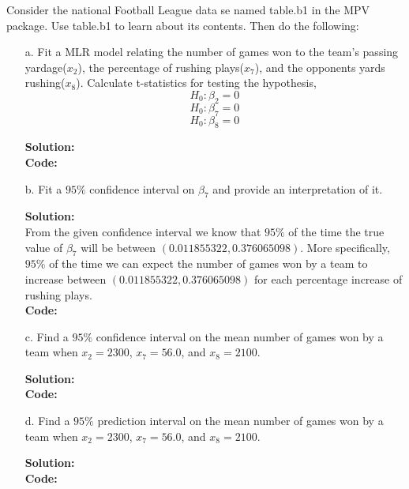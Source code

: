 \documentclass[12pt]{article}
\makeatletter
\theoremstyle{homework}
\newenvironment{exercise}[1]
{\def\@currentlabel{#1}\exercisecore}
{\endexercisecore}
\newcommand{\localhead}[1]{\par\smallskip\noindent\textbf{#1}\nobreak\\}%
\newcommand\solution{\localhead{Solution:}}
\makeatother
\begin{document}
\begin{exercise}{1}Consider the national Football League data se named table.b1 in the MPV package. 
  Use table.b1 to learn about its contents. Then do the following:

  \begin{enumerate}
    \item[a.] Fit a MLR model relating the number of games won to the team's passing yardage($x_2$),
    the percentage of rushing plays($x_7$), and the opponents yards rushing($x_8$). Calculate t-statistics for testing the hypothesis, 
    \begin{equation*}
      H_0: \beta_2 = 0
    \end{equation*} 
    \begin{equation*}
      H_0: \beta_7 = 0
    \end{equation*} 
    \begin{equation*}
      H_0: \beta_8 = 0
    \end{equation*} 
    \solution 
     \textbf{Code:}
     \begin{center}
     
     \end{center} 
     \newpage

     \item[b.] Fit a $95\%$ confidence interval on $\beta_7$ and provide an interpretation of it. \\
    \solution From the given confidence interval we know that $95\%$ of the time the true value of $\beta_7$
    will be between $(0.011855322,0.376065098)$. More specifically, $95\%$ of the time we can expect the number of games won by a team 
    to increase between $(0.011855322,0.376065098)$ for each percentage increase of rushing plays.  \\
     \textbf{Code:}
     \begin{center}
     
     \end{center} 
     \newpage

     \item[c.] Find a $95\%$ confidence interval on the mean number of games won by a team when $x_2 = 2300$,
     $x_7 = 56.0$, and $x_8 = 2100$.\\
     \solution
     \textbf{Code:}
     \begin{center}
     
     \end{center} 
     \newpage

     \item[d.] Find a $95\%$ prediction interval on the mean number of games won by a team when $x_2 = 2300$,
     $x_7 = 56.0$, and $x_8 = 2100$.\\
     \solution
     \textbf{Code:}
     \begin{center}
     
     \end{center} 
  \end{enumerate}
\end{exercise}
\end{document}
